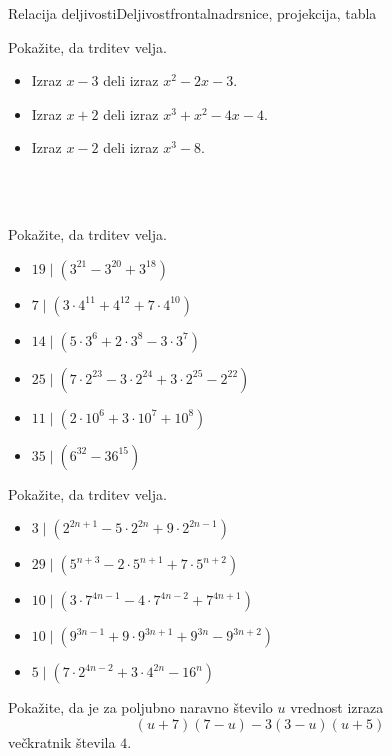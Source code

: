 \begin{priprava}{1}{}{Relacija deljivosti}{Deljivost}{frontalna}{drsnice, projekcija, tabla}
\begin{multicols}{2}
    \begin{naloga}
        Pokažite, da trditev velja.
        \begin{itemize}
            \item Izraz $x-3$ deli izraz $x^2-2x-3$. 
            \item Izraz $x+2$ deli izraz $x^3+x^2-4x-4$. 
            \item Izraz $x-2$ deli izraz $x^3-8$. 
        \end{itemize}
    \end{naloga}        

    ~\\~\\

    \begin{naloga}
        Pokažite, da trditev velja.
        \begin{itemize}
            \item $19\mid \left(3^{21}-3^{20}+3^{18}\right)$ 
            \item $7\mid \left(3\cdot 4^{11}+4^{12}+7\cdot 4^{10}\right)$ 
            \item $14\mid \left(5\cdot 3^6+2\cdot 3^8-3\cdot 3^7\right)$ 
            \item $25\mid \left(7\cdot 2^{23}-3\cdot 2^{24}+3\cdot 2^{25}-2^{22}\right)$ 
            \item $11\mid \left(2\cdot 10^6+3\cdot 10^7+10^8\right)$ 
            \item $35\mid \left(6^{32}-36^{15}\right)$ 
        \end{itemize}
    \end{naloga}        


    \begin{naloga}
        Pokažite, da trditev velja.
        \begin{itemize}
            \item $3\mid \left(2^{2n+1}-5\cdot 2^{2n}+9\cdot 2^{2n-1}\right)$ 
            \item $29\mid \left(5^{n+3}-2\cdot 5^{n+1}+7\cdot 5^{n+2}\right)$ 
            \item $10\mid \left(3\cdot 7^{4n-1}-4\cdot 7^{4n-2}+7^{4n+1}\right)$ 
            \item $10\mid \left(9^{3n-1}+9\cdot 9^{3n+1}+9^{3n}-9^{3n+2}\right)$ 
            \item $5\mid \left(7\cdot 2^{4n-2}+3\cdot 4^{2n}-16^n\right)$ 
        \end{itemize}
    \end{naloga}        

    \end{multicols}


    \begin{naloga}
        Pokažite, da je za poljubno naravno število $u$ vrednost izraza $$(u+7)(7-u)-3(3-u)(u+5)$$ večkratnik števila $4$.
    \end{naloga}     
            
 


\end{priprava}